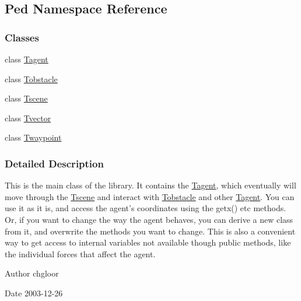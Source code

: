 \hypertarget{namespacePed}{
\subsection{Ped Namespace Reference}
\label{namespacePed}
}
\subsubsection*{Classes}
\begin{DoxyCompactItemize}
\item 
class \hyperlink{classPed_1_1Tagent}{Tagent}
\item 
class \hyperlink{classPed_1_1Tobstacle}{Tobstacle}
\item 
class \hyperlink{classPed_1_1Tscene}{Tscene}
\item 
class \hyperlink{classPed_1_1Tvector}{Tvector}
\item 
class \hyperlink{classPed_1_1Twaypoint}{Twaypoint}
\end{DoxyCompactItemize}


\subsubsection{Detailed Description}
This is the main class of the library. It contains the \hyperlink{classPed_1_1Tagent}{Tagent}, which eventually will move through the \hyperlink{classPed_1_1Tscene}{Tscene} and interact with \hyperlink{classPed_1_1Tobstacle}{Tobstacle} and other \hyperlink{classPed_1_1Tagent}{Tagent}. You can use it as it is, and access the agent's coordinates using the getx() etc methods. Or, if you want to change the way the agent behaves, you can derive a new class from it, and overwrite the methods you want to change. This is also a convenient way to get access to internal variables not available though public methods, like the individual forces that affect the agent. \begin{DoxyAuthor}{Author}
chgloor 
\end{DoxyAuthor}
\begin{DoxyDate}{Date}
2003-\/12-\/26 
\end{DoxyDate}
